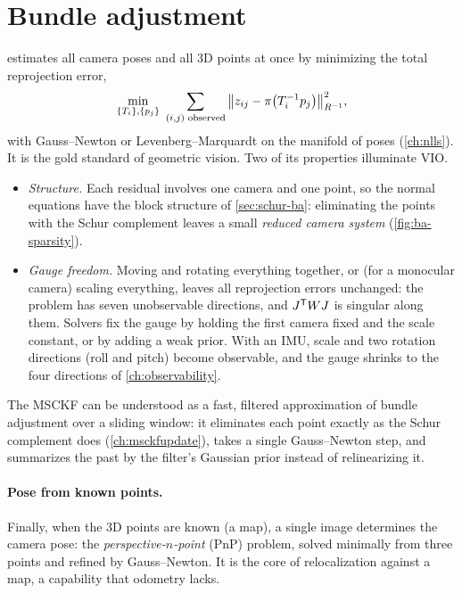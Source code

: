 \section{Bundle adjustment}
\label{sec:bundle-adjustment}

 estimates all camera poses and all 3D points at once by minimizing the total reprojection error,
\begin{equation}
  \min_{\{T_i\},\{p_j\}}\ \sum_{(i,j)\text{ observed}}\big\|z_{ij} - \pi\big(T_i^{-1} p_j\big)\big\|^2_{R^{-1}},
\end{equation}
with Gauss--Newton or Levenberg--Marquardt on the manifold of poses (\cref{ch:nlls}). It is the gold standard of geometric vision. Two of its properties illuminate
VIO.
\begin{itemize}
  \item \emph{Structure.} Each residual involves one camera and one point, so the normal equations have the block structure of \cref{sec:schur-ba}: eliminating the
        points with the Schur complement leaves a small \emph{reduced camera system} (\cref{fig:ba-sparsity}).
  \item \emph{Gauge freedom.} Moving and rotating everything together, or (for a monocular camera) scaling everything, leaves all reprojection errors unchanged: the
        problem has seven unobservable directions, and $J^{\mathsf{T}} WJ$ is singular along them. Solvers fix the gauge by holding the first camera fixed and the scale constant, or
        by adding a weak prior. With an IMU, scale and two rotation directions (roll and pitch) become observable, and the gauge shrinks to the four directions of
        \cref{ch:observability}.
\end{itemize}
The MSCKF can be understood as a fast, filtered approximation of bundle adjustment over a sliding window: it eliminates each point exactly as the Schur complement
does (\cref{ch:msckfupdate}), takes a single Gauss--Newton step, and summarizes the past by the filter's Gaussian prior instead of relinearizing it.

\paragraph{Pose from known points.} Finally, when the 3D points are known (a map), a single image determines the camera pose: the
\emph{perspective-$n$-point} (PnP) problem, solved minimally from three points and refined by Gauss--Newton. It is the core of relocalization against a map, a
capability that odometry lacks.

